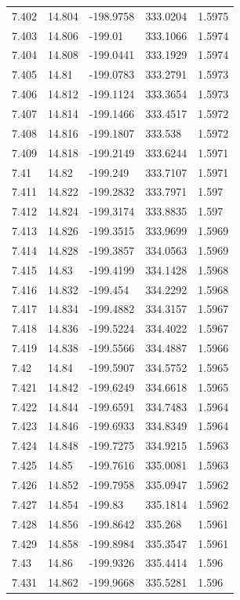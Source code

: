 \begin{tabular}{lllll}
7.402 & 14.804 & -198.9758 & 333.0204 & 1.5975 \\
7.403 & 14.806 & -199.01 & 333.1066 & 1.5974 \\
7.404 & 14.808 & -199.0441 & 333.1929 & 1.5974 \\
7.405 & 14.81 & -199.0783 & 333.2791 & 1.5973 \\
7.406 & 14.812 & -199.1124 & 333.3654 & 1.5973 \\
7.407 & 14.814 & -199.1466 & 333.4517 & 1.5972 \\
7.408 & 14.816 & -199.1807 & 333.538 & 1.5972 \\
7.409 & 14.818 & -199.2149 & 333.6244 & 1.5971 \\
7.41 & 14.82 & -199.249 & 333.7107 & 1.5971 \\
7.411 & 14.822 & -199.2832 & 333.7971 & 1.597 \\
7.412 & 14.824 & -199.3174 & 333.8835 & 1.597 \\
7.413 & 14.826 & -199.3515 & 333.9699 & 1.5969 \\
7.414 & 14.828 & -199.3857 & 334.0563 & 1.5969 \\
7.415 & 14.83 & -199.4199 & 334.1428 & 1.5968 \\
7.416 & 14.832 & -199.454 & 334.2292 & 1.5968 \\
7.417 & 14.834 & -199.4882 & 334.3157 & 1.5967 \\
7.418 & 14.836 & -199.5224 & 334.4022 & 1.5967 \\
7.419 & 14.838 & -199.5566 & 334.4887 & 1.5966 \\
7.42 & 14.84 & -199.5907 & 334.5752 & 1.5965 \\
7.421 & 14.842 & -199.6249 & 334.6618 & 1.5965 \\
7.422 & 14.844 & -199.6591 & 334.7483 & 1.5964 \\
7.423 & 14.846 & -199.6933 & 334.8349 & 1.5964 \\
7.424 & 14.848 & -199.7275 & 334.9215 & 1.5963 \\
7.425 & 14.85 & -199.7616 & 335.0081 & 1.5963 \\
7.426 & 14.852 & -199.7958 & 335.0947 & 1.5962 \\
7.427 & 14.854 & -199.83 & 335.1814 & 1.5962 \\
7.428 & 14.856 & -199.8642 & 335.268 & 1.5961 \\
7.429 & 14.858 & -199.8984 & 335.3547 & 1.5961 \\
7.43 & 14.86 & -199.9326 & 335.4414 & 1.596 \\
7.431 & 14.862 & -199.9668 & 335.5281 & 1.596 \\

\end{tabular}
